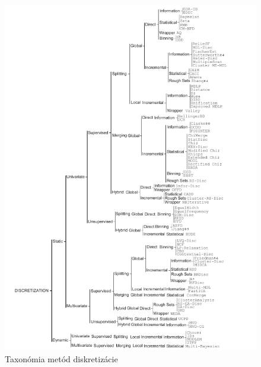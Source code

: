 \begin{figure}
	\centering
	\includegraphics[height=1.36\linewidth]{obrazky/obrazok3}
	\caption{Taxonómia metód diskretizácie}
	\label{fig:obrazok3}
\end{figure}



